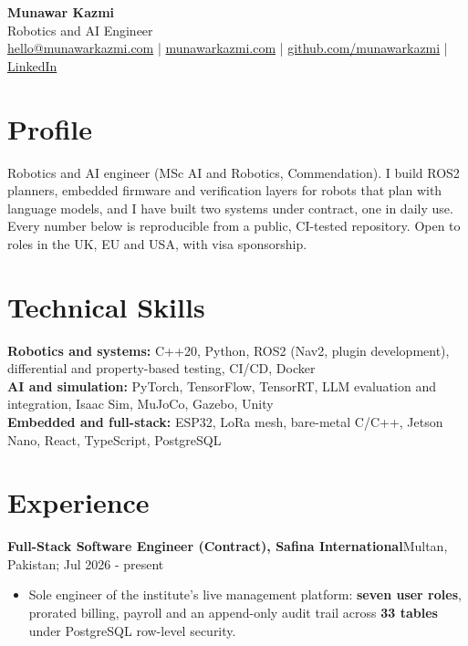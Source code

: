 \documentclass[10pt]{article}
\newcommand{\entry}[2]{{\textbf{#1}\hfill {\small #2}\par}}
\begin{document}
\begin{center}
{\LARGE\bfseries Munawar Kazmi}\\[2pt]
{\normalsize Robotics and AI Engineer}\\[3pt]
{\small
\href{mailto:hello@munawarkazmi.com}{hello@munawarkazmi.com} \;|\;
\href{https://munawarkazmi.com}{munawarkazmi.com} \;|\;
\href{https://github.com/munawarkazmi}{github.com/munawarkazmi} \;|\;
\href{https://www.linkedin.com/in/munawar-kazmi/}{LinkedIn}}
\end{center}

\vspace{-2pt}
\section{Profile}
Robotics and AI engineer (MSc AI and Robotics, Commendation). I build ROS2 planners, embedded firmware and
verification layers for robots that plan with language models, and I have built two systems under contract, one in daily use.
Every number below is reproducible from a public, CI-tested repository. Open to roles in the UK, EU and USA, with visa sponsorship.

\section{Technical Skills}
{\small
\textbf{Robotics and systems:} C++20, Python, ROS2 (Nav2, plugin development), differential and property-based testing, CI/CD, Docker\\
\textbf{AI and simulation:} PyTorch, TensorFlow, TensorRT, LLM evaluation and integration, Isaac Sim, MuJoCo, Gazebo, Unity\\
\textbf{Embedded and full-stack:} ESP32, LoRa mesh, bare-metal C/C++, Jetson Nano, React, TypeScript, PostgreSQL}

\section{Experience}

\entry{Full-Stack Software Engineer (Contract), Safina International}{Multan, Pakistan; Jul 2026 - present}
\begin{itemize}
\item Sole engineer of the institute's live management platform: \textbf{seven user roles}, prorated billing, payroll and
an append-only audit trail across \textbf{33 tables} under PostgreSQL row-level security.
\end{itemize}
\end{document}
